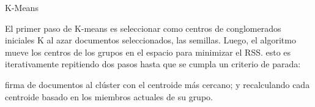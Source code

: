 \documentclass{llncs}
\DeclareMathOperator*{\argmin}{arg\,min}
\begin{document}
\begin{itemize}
	\begin{algorithm}
		\caption{K-Means}
		\begin{algorithmic}[1]
			\EndFor
				\EndFor
				\State{$ j \leftarrow \argmin_{j'}|\overrightarrow{\mu_{j'}}-\overrightarrow{x_{n}}| $}
				\EndFor
				\EndFor
			\EndWhile
		\end{algorithmic}
	\end{algorithm}
\end{itemize}

\newpage
El primer paso de K-means es seleccionar como centros de conglomerados iniciales K al azar documentos seleccionados, las semillas. Luego, el algoritmo mueve los centros de los grupos
en el espacio para minimizar el RSS. esto es
iterativamente repitiendo dos pasos hasta que se cumpla un criterio de parada: 

firma de documentos al clúster con el centroide más cercano; y recalculando cada centroide basado en los miembros actuales de su grupo. 
\end{document}
